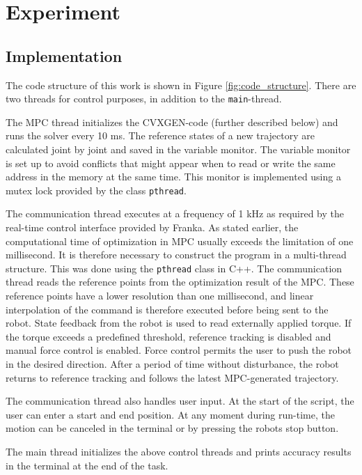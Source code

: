 \documentclass[final]{LTHtwocol} %
\begin{document}
\section{Experiment}\label{sec:experiment}
\subsection{Implementation}
The code structure of this work is shown in Figure \ref{fig:code_structure}. There are two threads for control purposes, in addition to the \texttt{main}-thread.

The MPC thread initializes the CVXGEN-code (further described below) and runs the solver every 10 ms. The reference states of a new trajectory are calculated joint by joint and saved in the variable monitor. The variable monitor is set up to avoid conflicts that might appear when to read or write the same address in the memory at the same time. This monitor is implemented using a mutex lock provided by the class \texttt{pthread}.

The communication thread executes at a frequency of 1 kHz as required by the real-time control interface provided by Franka. As stated earlier, the computational time of optimization in MPC usually exceeds the limitation of one millisecond. It is therefore necessary to construct the program in a multi-thread structure. This was done using the \texttt{pthread} class in C++. The communication thread reads the reference points from the optimization result of the MPC. These reference points have a lower resolution than one millisecond, and linear interpolation of the command is therefore executed before being sent to the robot. 
State feedback from the robot is used to read externally applied torque. If the torque exceeds a predefined threshold, reference tracking is disabled and manual force control is enabled. Force control permits the user to push the robot in the desired direction. After a period of time without disturbance, the robot returns to reference tracking and follows the latest MPC-generated trajectory.

The communication thread also handles user input. At the start of the script, the user can enter a start and end position. At any moment during run-time, the motion can be canceled in the terminal or by pressing the robots stop button.

The main thread initializes the above control threads and prints accuracy results in the terminal at the end of the task.
\end{document}
